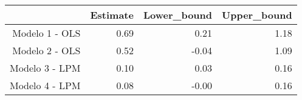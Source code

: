 \begin{table}[ht]
\centering
\begin{tabular}{rrrr}
  \hline
 & Estimate & Lower\_bound & Upper\_bound \\ 
  \hline
Modelo 1 - OLS & 0.69 & 0.21 & 1.18 \\ 
  Modelo 2 - OLS & 0.52 & -0.04 & 1.09 \\ 
  Modelo 3 - LPM & 0.10 & 0.03 & 0.16 \\ 
  Modelo 4 - LPM & 0.08 & -0.00 & 0.16 \\ 
   \hline
\end{tabular}
\end{table}
